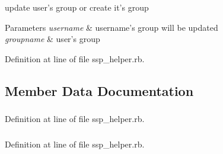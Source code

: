 update user's group or create it's group 


\begin{DoxyParams}{Parameters}
{\em username} & username's group will be updated \\
\hline
{\em groupname} & user's group \\
\hline
\end{DoxyParams}


Definition at line  of file \-s\-s\-p\_\-\-h\-e\-l\-p\-e\-r\-.\-r\-b.



\subsection{Member Data Documentation}
\hypertarget{classSSP__Helper_ac2eb114aa8118d494865309bf4dbf84b}{
\subsubsection[{\-c\-o\-n\-f\-i\-g}]{\hspace{0.3cm}{\ttfamily  \mbox{[}\-r\-e\-a\-d, \-w\-r\-i\-t\-e\mbox{]}}}}
\label{classSSP__Helper_ac2eb114aa8118d494865309bf4dbf84b}


Definition at line  of file \-s\-s\-p\_\-\-h\-e\-l\-p\-e\-r\-.\-r\-b.

\hypertarget{classSSP__Helper_a78aae93c2b5611ab9a6948fa06b389f6}{
\subsubsection[{\-o\-n\-e\_\-\-a\-u\-t\-h}]{\hspace{0.3cm}{\ttfamily  \mbox{[}\-r\-e\-a\-d, \-w\-r\-i\-t\-e\mbox{]}}}}
\label{classSSP__Helper_a78aae93c2b5611ab9a6948fa06b389f6}


Definition at line  of file \-s\-s\-p\_\-\-h\-e\-l\-p\-e\-r\-.\-r\-b.

